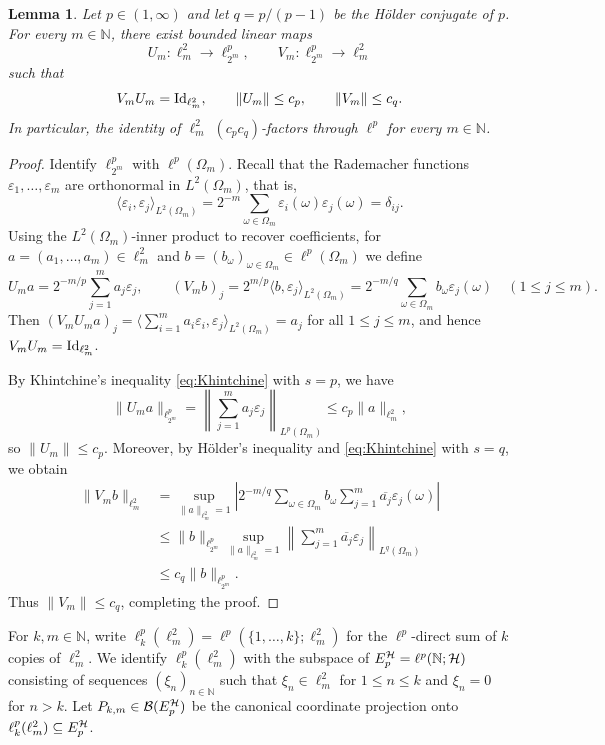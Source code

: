 \documentclass[11pt,reqno]{amsart}
\theoremstyle{definition}
\theoremstyle{plain}
\newtheorem{Lem}[Def]{Lemma}
\def\IN{\mathbb N}\def\IR{\mathbb R}\def\IE{\mathbb E}\def\IC{\mathbb C}\def\IL{\mathbb L}\def\IQ{\mathbb Q}\def\IA{\mathbb A}\def\IZ{\mathbb Z}
\begin{document}
\begin{Lem}\label{lem:Khintchine_factor}
Let $p \in (1,\infty)$ and let $q=p/(p-1)$ be the H\"older conjugate of $p$. For every $m\in\IN$, there exist bounded linear maps
\[
U_m:\ell^2_m\longrightarrow\ell^p_{2^m},\qquad V_m:\ell^p_{2^m}\longrightarrow\ell^2_m
\]
such that
\[
V_mU_m=\textup{Id}_{\ell^2_m},\qquad \|U_m\|\le c_p,\qquad \|V_m\|\le c_q.
\]
In particular, the identity of $\ell^2_m$ $(c_pc_q)$-factors through $\ell^p$ for every $m\in\IN$.
\end{Lem}

\begin{proof}
Identify $\ell^p_{2^m}$ with $\ell^p(\Omega_m)$. Recall that the Rademacher functions $\varepsilon_1,\ldots,\varepsilon_m$ are orthonormal in $L^2(\Omega_m)$, that is,
\[
\langle\varepsilon_i,\varepsilon_j\rangle_{L^2(\Omega_m)}=2^{-m}\sum_{\omega\in\Omega_m}\varepsilon_i(\omega)\varepsilon_j(\omega)=\delta_{ij}.
\]
Using the $L^2(\Omega_m)$-inner product to recover coefficients, for $a=(a_1,\ldots,a_m)\in\ell^2_m$ and $b=(b_\omega)_{\omega\in\Omega_m}\in\ell^p(\Omega_m)$ we define
\[
U_ma=2^{-m/p}\sum_{j=1}^m a_j\varepsilon_j,\qquad (V_mb)_j=2^{m/p}\langle b,\varepsilon_j\rangle_{L^2(\Omega_m)}=2^{-m/q}\sum_{\omega\in\Omega_m}b_\omega\varepsilon_j(\omega)\quad (1\le j\le m).
\]
Then $(V_mU_ma)_j=\langle\sum_{i=1}^m a_i\varepsilon_i,\varepsilon_j\rangle_{L^2(\Omega_m)}=a_j$ for all $1\le j\le m$, and hence $V_mU_m=\textup{Id}_{\ell^2_m}$.


By Khintchine's inequality \eqref{eq:Khintchine} with $s=p$, we have
\[
\|U_ma\|_{\ell^p_{2^m}}=\left\|\sum_{j=1}^m a_j\varepsilon_j\right\|_{L^p(\Omega_m)}\le c_p\|a\|_{\ell^2_m},
\]
so $\|U_m\|\le c_p$. Moreover, by H\"older's inequality and \eqref{eq:Khintchine} with $s=q$, we obtain
\[
\begin{aligned}
\|V_mb\|_{\ell^2_m}
&=\sup_{\|a\|_{\ell^2_m}=1}\left|2^{-m/q}\sum_{\omega\in\Omega_m}b_\omega\sum_{j=1}^m\overline{a_j}\varepsilon_j(\omega)\right|\\
&\le \|b\|_{\ell^p_{2^m}}\sup_{\|a\|_{\ell^2_m}=1}\left\|\sum_{j=1}^m\overline{a_j}\varepsilon_j\right\|_{L^q(\Omega_m)}\\
&\le c_q\|b\|_{\ell^p_{2^m}}.
\end{aligned}
\]
Thus $\|V_m\|\le c_q$, completing the proof.
\end{proof}





For $k,m\in\IN$, write $\ell^p_k(\ell^2_m)=\ell^p(\{1,\ldots,k\};\ell^2_m)$ for the $\ell^p$-direct sum of $k$ copies of $\ell^2_m$. We identify $\ell^p_k(\ell^2_m)$ with the subspace of $E_p^{\H}=\ell^p(\IN;\H)$ consisting of sequences $(\xi_n)_{n\in\IN}$ such that $\xi_n\in\ell^2_m$ for $1\le n\le k$ and $\xi_n=0$ for $n>k$. Let $P_{k,m}\in\mathcal B(E_p^{\mathcal H})$ be the canonical coordinate projection onto $\ell^p_k(\ell^2_m)\subseteq E_p^{\mathcal H}$.
\end{document}
